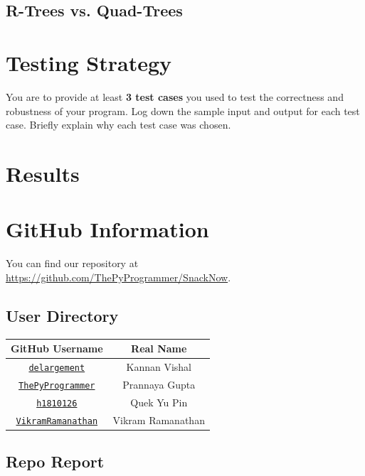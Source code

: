 \documentclass[12pt]{article}
\begin{document}
{\subsection{R-Trees vs. Quad-Trees}


\section{Testing Strategy}
You are to provide at least \textbf{3 test cases} you used to test the correctness and
robustness of your program. Log down the sample input and output for each test case.
Briefly explain why each test case was chosen.



\section{Results}


\newpage
\section{GitHub Information}
You can find our repository at \url{https://github.com/ThePyProgrammer/SnackNow}.

\subsection{User Directory}
\begin{center}
    \begin{tabular}{|c|c|}
        \hline
        GitHub Username & Real Name \\
        \hline
        \href{https://github.com/delargement}{\texttt{delargement}} & Kannan Vishal \\
        \href{https://github.com/ThePyProgrammer}{\texttt{ThePyProgrammer}} & Prannaya Gupta \\
        \href{https://github.com/h1810126}{\texttt{h1810126}} & Quek Yu Pin \\
        \href{https://github.com/VikramRamanathan}{\texttt{VikramRamanathan}} & Vikram Ramanathan \\
        \hline
    \end{tabular}
\end{center}


\subsection{Repo Report}

}
\end{document}
